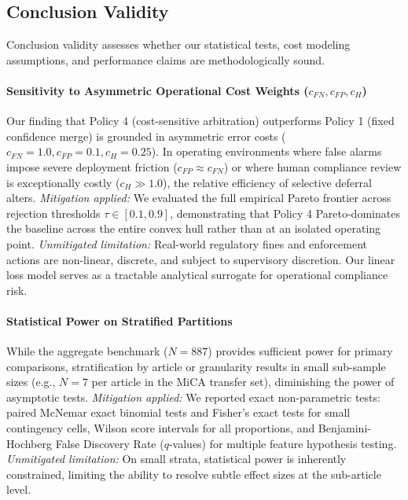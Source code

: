 \subsection{Conclusion Validity}
Conclusion validity assesses whether our statistical tests, cost modeling assumptions, and performance claims are methodologically sound.

\paragraph{Sensitivity to Asymmetric Operational Cost Weights ($c_{FN}, c_{FP}, c_H$)}
Our finding that Policy 4 (cost-sensitive arbitration) outperforms Policy 1 (fixed confidence merge) is grounded in asymmetric error costs ($c_{FN}=1.0, c_{FP}=0.1, c_H=0.25$). In operating environments where false alarms impose severe deployment friction ($c_{FP} \approx c_{FN}$) or where human compliance review is exceptionally costly ($c_H \gg 1.0$), the relative efficiency of selective deferral alters.
\textit{Mitigation applied:} We evaluated the full empirical Pareto frontier across rejection thresholds $\tau \in [0.1, 0.9]$, demonstrating that Policy 4 Pareto-dominates the baseline across the entire convex hull rather than at an isolated operating point.
\textit{Unmitigated limitation:} Real-world regulatory fines and enforcement actions are non-linear, discrete, and subject to supervisory discretion. Our linear loss model serves as a tractable analytical surrogate for operational compliance risk.

\paragraph{Statistical Power on Stratified Partitions}
While the aggregate benchmark ($N=887$) provides sufficient power for primary comparisons, stratification by article or granularity results in small sub-sample sizes (e.g., $N=7$ per article in the MiCA transfer set), diminishing the power of asymptotic tests.
\textit{Mitigation applied:} We reported exact non-parametric tests: paired McNemar exact binomial tests and Fisher's exact tests for small contingency cells, Wilson score intervals for all proportions, and Benjamini-Hochberg False Discovery Rate ($q$-values) for multiple feature hypothesis testing.
\textit{Unmitigated limitation:} On small strata, statistical power is inherently constrained, limiting the ability to resolve subtle effect sizes at the sub-article level.


